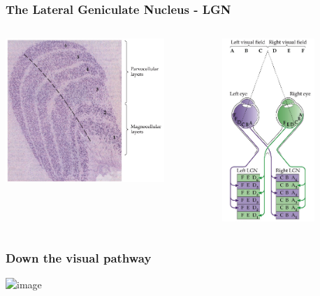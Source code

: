 \documentclass[]{beamer}
\begin{document}
\begin{frame}
 \frametitle{The Lateral Geniculate Nucleus - LGN}
\begin{columns}[T]
 \begin{column}{60mm}
\includegraphics[width=60mm]{figs/l3/lgn_layers.png}
 \end{column}

 \begin{column}{50mm}
\includegraphics[width=35mm]{figs/l3/visual_field_lgn.png}
 \end{column}
\end{columns}
\end{frame}

\begin{frame}
 \frametitle{Down the visual pathway}
\begin{center}
\includegraphics<1>[width=80mm]{figs/l3/cortical_pathways2.png}
\end{center}
\end{frame}
\end{document}
